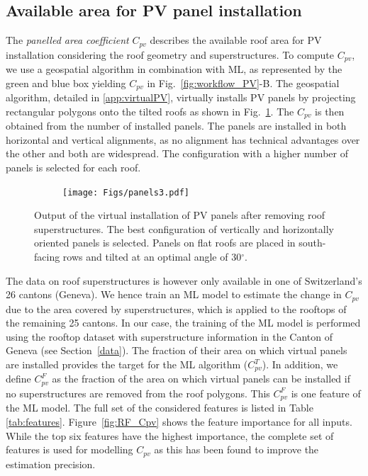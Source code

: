 
\subsection{Available area for PV panel installation}
\label{panels}

The \textit{panelled area coefficient} $C_{pv}$ describes the available roof area for PV installation considering the roof geometry and superstructures. To compute $C_{pv}$, we use a geospatial algorithm in combination with ML, as represented by the green and blue box yielding $C_{pv}$ in Fig.~\ref{fig:workflow_PV}-B.
%
The geospatial algorithm, detailed in \ref{app:virtualPV}, virtually installs PV panels by projecting rectangular polygons onto the tilted roofs as shown in Fig.~\ref{fig:panels}. The $C_{pv}$ is then obtained from the number of installed panels.
The panels are installed in both horizontal and vertical alignments, as no alignment has technical advantages over the other and both are widespread. The configuration with a higher number of panels is selected for each roof.

\begin{figure}[tb]
\centering
\begin{subfigure}{.5\textwidth}
  \centering
  \texttt{[image: Figs/panels3.pdf]}  
\end{subfigure}
\caption{Output of the virtual installation of PV panels after removing roof superstructures. The best configuration of vertically and horizontally oriented panels is selected. Panels on flat roofs are placed in south-facing rows and tilted at an optimal angle of 30$^\circ$.}
\label{fig:panels}
\end{figure}

The data on roof superstructures is however only available in one of Switzerland's 26 cantons (Geneva). We hence train an ML model to estimate the change in $C_{pv}$ due to the area covered by superstructures, which is applied to the rooftops of the remaining 25 cantons. 
%
In our case, the training of the ML model is performed using the rooftop dataset with superstructure information in the Canton of Geneva (see Section~\ref{data}).
The fraction of their area on which virtual panels are installed provides the target for the ML algorithm ($C_{pv}^T$).
In addition, we define $C_{pv}^F$ as the fraction of the area on which virtual panels can be installed if no superstructures are removed from the roof polygons. This $C_{pv}^F$ is one feature of the ML model. %
The full set of the considered features is listed in Table \ref{tab:features}. 
Figure~\ref{fig:RF_Cpv} shows the feature importance for all inputs. 
While the top six features have the highest importance, 
the complete set of features is used for modelling $C_{pv}$ as this has been found to improve the estimation precision.

